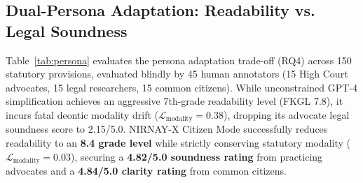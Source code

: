 \documentclass[conference]{IEEEtran}
\begin{document}
\begin{table}[!t]
\caption{Factuality, Entailment, and Adversarial Defense ($N=400$)}
\label{tab:factuality}
\centering
{}
\end{table}

\subsection{Dual-Persona Adaptation: Readability vs. Legal Soundness}
Table~\ref{tab:persona} evaluates the persona adaptation trade-off (RQ4) across 150 statutory provisions, evaluated blindly by 45 human annotators (15 High Court advocates, 15 legal researchers, 15 common citizens). While unconstrained GPT-4 simplification achieves an aggressive 7th-grade readability level (FKGL 7.8), it incurs fatal deontic modality drift ($\mathcal{L}_{\text{modality}} = 0.38$), dropping its advocate legal soundness score to 2.15/5.0. NIRNAY-X Citizen Mode successfully reduces readability to an \textbf{8.4 grade level} while strictly conserving statutory modality ($\mathcal{L}_{\text{modality}} = 0.03$), securing a \textbf{4.82/5.0 soundness rating} from practicing advocates and a \textbf{4.84/5.0 clarity rating} from common citizens.

\begin{table}[!t]
\caption{Persona Adaptation: Readability vs. Soundness ($N=150$)}
\label{tab:persona}
\centering
{}
\end{table}
\end{document}

